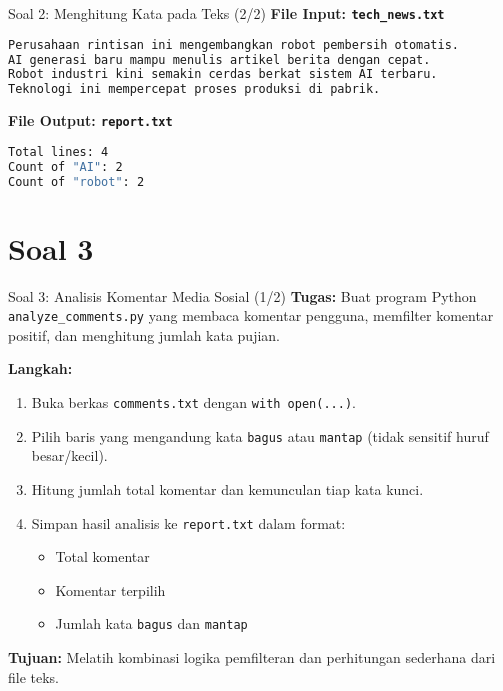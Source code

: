 \documentclass[aspectratio=169, table]{beamer}
\begin{document}
\begin{frame}[fragile]{Soal 2: Menghitung Kata pada Teks (2/2)}
\vspace{15pt}
\textbf{File Input: \texttt{tech\_news.txt}}
\begin{lstlisting}[language=bash,basicstyle=\ttfamily\small]
Perusahaan rintisan ini mengembangkan robot pembersih otomatis.
AI generasi baru mampu menulis artikel berita dengan cepat.
Robot industri kini semakin cerdas berkat sistem AI terbaru.
Teknologi ini mempercepat proses produksi di pabrik.
\end{lstlisting}

\textbf{File Output: \texttt{report.txt}}
\begin{lstlisting}[language=bash,basicstyle=\ttfamily\small]
Total lines: 4
Count of "AI": 2
Count of "robot": 2
\end{lstlisting}
\end{frame}


\section{Soal 3}
\begin{frame}[fragile]{Soal 3: Analisis Komentar Media Sosial (1/2)}
\vspace{15pt}
\textbf{Tugas:}  
Buat program Python \texttt{analyze\_comments.py} yang membaca komentar pengguna, memfilter komentar positif, dan menghitung jumlah kata pujian.

\textbf{Langkah:}
\begin{enumerate}
  \item Buka berkas \texttt{comments.txt} dengan \texttt{with open(...)}.
  \item Pilih baris yang mengandung kata \texttt{bagus} atau \texttt{mantap}  
        (tidak sensitif huruf besar/kecil).
  \item Hitung jumlah total komentar dan kemunculan tiap kata kunci.
  \item Simpan hasil analisis ke \texttt{report.txt} dalam format:
        \begin{itemize}
          \item Total komentar
          \item Komentar terpilih
          \item Jumlah kata \texttt{bagus} dan \texttt{mantap}
        \end{itemize}
\end{enumerate}
\textbf{Tujuan:}  
Melatih kombinasi logika pemfilteran dan perhitungan sederhana dari file teks.
\end{frame}
\end{document}
